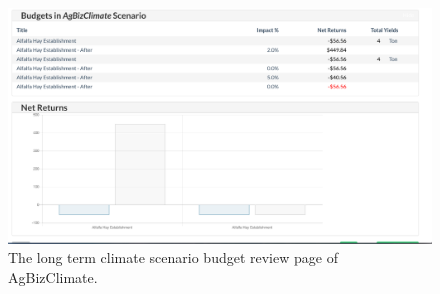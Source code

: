 \documentclass[onecolumn, draftclsnofoot,10pt, compsoc]{article}
\begin{document}
            
        \begin{figure}[h!]
            \includegraphics[width=18cm]{./Images/AgBizBudgets.png}
            \caption{The long term climate scenario budget review page of AgBizClimate.}
        \end{figure}
\end{document}
